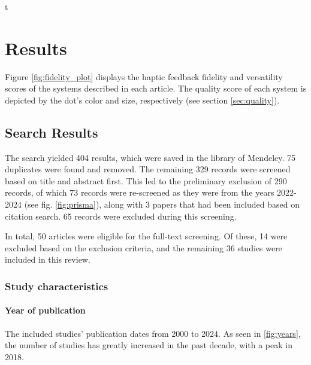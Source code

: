 t\section{Results}
\label{sec:results}

Figure \ref{fig:fidelity_plot} displays the haptic feedback fidelity and versatility scores of the systems described in each article. The quality score of each system is depicted by the dot's color and size, respectively (see section \ref{sec:quality}).


\subsection{Search Results}


The search yielded 404 results, which were saved in the library of Mendeley. 75 duplicates were found and removed. The remaining 329 records were screened based on title and abstract first. This led to the preliminary exclusion of 290 records, of which 73 records were re-screened as they were from the years 2022-2024 (see fig. \ref{fig:prisma}), along with 3 papers that had been included based on citation search. 
65 records were excluded during this screening.

In total, 50 articles were eligible for the full-text screening. Of these, 14 were excluded based on the exclusion criteria, and the remaining 36 studies were included in this review.


\subsubsection{Study characteristics}
\paragraph{Year of publication}
The included studies' publication dates from 2000 to 2024. As seen in \ref{fig:years}, the number of studies has greatly increased in the past decade, with a peak in 2018.

